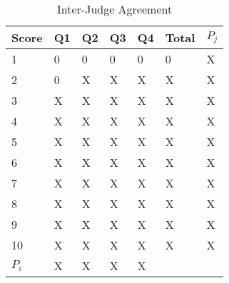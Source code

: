 \begin{table}
\begin{center}
\caption{Inter-Judge Agreement}
\begin{tabular}{| l || l | l | l | l || l | l |}
\hline
Score & Q1 & Q2 & Q3 & Q4 & Total & $P_j$\\ \hline
1 & 0 & 0 & 0 & 0 & 0 & X \\ 
2 & 0 & X & X & X & X & X \\
3 & X & X & X & X & X & X \\
4 & X & X & X & X & X & X \\
5 & X & X & X & X & X & X \\
6 & X & X & X & X & X & X \\
7 & X & X & X & X & X & X \\
8 & X & X & X & X & X & X \\
9 & X & X & X & X & X & X \\
10 & X & X & X & X & X & X \\ \hline
$P_i$ & X & X & X & X &  &  \\ \hline
\end{tabular}
\label{tbl1:kappa}
\end{center}
\end{table}	
